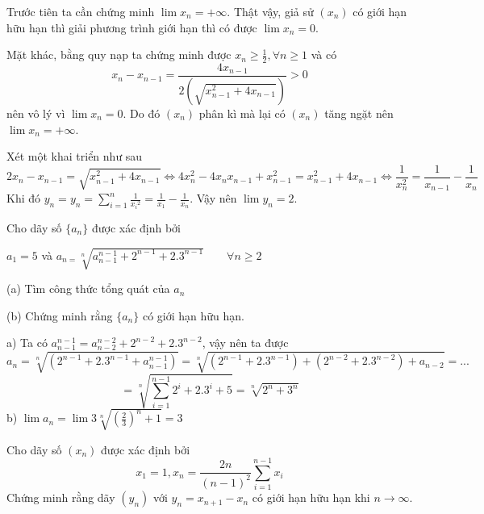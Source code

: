 \documentclass[11pt]{scrartcl}
\begin{document}
\begin{itemize}[label=, leftmargin=0em, itemsep=0.5em]
    \begin{sol}
        Trước tiên ta cần chứng minh $\lim x_n = +\infty$. Thật vậy, giả sử $(x_n)$ có giới hạn hữu hạn thì giải phương trình giới hạn thì có được $\lim x_n = 0$. 
        
        
        Mặt khác, bằng quy nạp ta chứng minh được $x_n \geq \frac{1}{2}, \forall n \geq 1$ và có \[x_n - x_{n - 1} = \frac{4x_{n - 1}}{2(\sqrt{x_{n-1}^2 + 4x_{n-1}})} > 0\] nên vô lý vì $\lim x_n = 0$. Do đó $(x_n)$ phân kì mà lại có $(x_n)$ tăng ngặt nên $\lim x_n = +\infty$.


        Xét một khai triển như sau
        \[2x_n - x_{n - 1} = \sqrt{x_{n - 1}^2 + 4x_{n - 1}} \Leftrightarrow 4x_n^2 - 4x_nx_{n - 1} + x_{n -1}^2 = x_{n - 1}^2 + 4x_{n-1} \Leftrightarrow \frac{1}{x_n^2} = \frac{1}{x_{n -1}} - \frac{1}{x_n} \]
        Khi đó $y_n = \displaystyle  y_n=\sum_{i=1}^{n}\frac{1}{{{x}_{i}}^{2}} =  \frac{1}{x_1} - \frac{1}{x_n}$. Vậy nên $\lim y_n = 2$.
    \end{sol}
    \begin{bt}
        Cho dãy số $\{a_{n}\}$ được xác định bởi

$a_{1}=5$ và $a_{n=}\sqrt[n]{a_{n-1}^{n-1}+2^{n-1}+2.3^{n-1}} \qquad \forall n\geq2$

(a) Tìm công thức tổng quát của $a_{n}$

(b) Chứng minh rằng $\{a_{n}\}$ có giới hạn hữu hạn.
        
    \end{bt}

    \begin{sol}
        a) Ta có $a_{n - 1}^{n - 1} = a_{n - 2}^{n -2} + 2^{n -2} + 2.3^{n -2}$, vậy nên ta được
        \[a_n = \sqrt[n]{(2^{n -1} + 2.3^{n -1} + a_{n -1}^{n -1})} = \sqrt[n]{(2^{n -1} + 2.3^{n -1}) + (2^{n -2} + 2.3^{n -2}) +  a_{n - 2}}  =...\] \[=\sqrt[n]{\sum_{i = 1}^{n -1} 2^i + 2.3^i + 5} = \sqrt[n]{2^n + 3^{n}}\]
        b) $\lim a_n = \lim 3\sqrt[n]{\left(\frac{2}{3}\right)^n + 1} = 3$
    \end{sol}
    \begin{bt}
        Cho dãy số $(x_n)$ được xác định bởi
\[x_1=1, x_n=\dfrac{2n}{(n-1)^2}\sum_{i=1}^{n-1}x_i\]
Chứng minh rằng dãy $(y_n)$ với $y_n=x_{n+1}-x_n$ có giới hạn hữu hạn khi $n\to \infty.$
    \end{bt}


\end{itemize}
\end{document}
